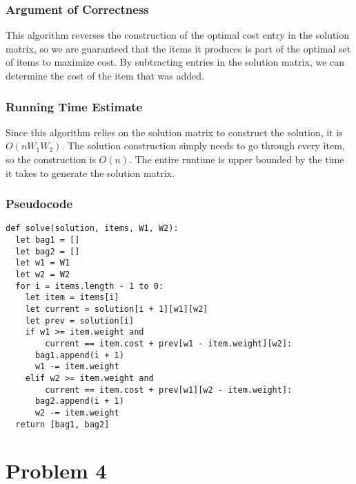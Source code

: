 \documentclass{math}
\begin{document}
\subsubsection*{Argument of Correctness}
This algorithm reverses the construction of the optimal cost entry in the
solution matrix, so we are guaranteed that the items it produces is part of the
optimal set of items to maximize cost. By subtracting entries in the solution
matrix, we can determine the cost of the item that was added.

\subsubsection*{Running Time Estimate}
Since this algorithm relies on the solution matrix to construct the solution,
it is \( O(nW_1W_2) \). The solution construction simply needs to go through
every item, so the construction is \( O(n) \). The entire runtime is upper
bounded by the time it takes to generate the solution matrix.

\subsubsection*{Pseudocode}
\begin{lstlisting}
def solve(solution, items, W1, W2):
  let bag1 = []
  let bag2 = []
  let w1 = W1
  let w2 = W2
  for i = items.length - 1 to 0:
    let item = items[i]
    let current = solution[i + 1][w1][w2]
    let prev = solution[i]
    if w1 >= item.weight and
        current == item.cost + prev[w1 - item.weight][w2]:
      bag1.append(i + 1)
      w1 -= item.weight
    elif w2 >= item.weight and
        current == item.cost + prev[w1][w2 - item.weight]:
      bag2.append(i + 1)
      w2 -= item.weight
  return [bag1, bag2]
\end{lstlisting}

\section*{Problem 4}
\end{document}
